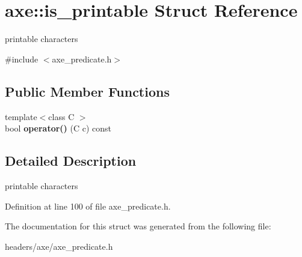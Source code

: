 \hypertarget{structaxe_1_1is__printable}{\section{axe\+:\+:is\+\_\+printable Struct Reference}
\label{structaxe_1_1is__printable}
}


printable characters  




{\ttfamily \#include $<$axe\+\_\+predicate.\+h$>$}

\subsection*{Public Member Functions}
\begin{DoxyCompactItemize}
\item 
\hypertarget{structaxe_1_1is__printable_ae57b159d029a7a7e7304eeb6fb0bc363}{{\footnotesize template$<$class C $>$ }\\bool {\bfseries operator()} (C c) const }\label{structaxe_1_1is__printable_ae57b159d029a7a7e7304eeb6fb0bc363}

\end{DoxyCompactItemize}


\subsection{Detailed Description}
printable characters 

Definition at line 100 of file axe\+\_\+predicate.\+h.



The documentation for this struct was generated from the following file\+:\begin{DoxyCompactItemize}
\item 
headers/axe/axe\+\_\+predicate.\+h\end{DoxyCompactItemize}
